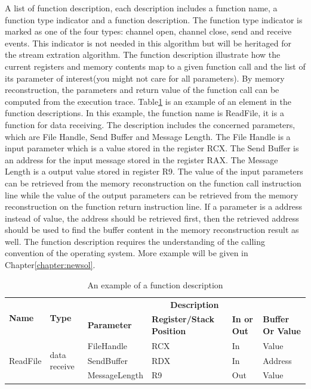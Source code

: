 A list of function description, each description includes a function name, a function type indicator and a function description. The function type indicator is marked as one of the four types: channel open, channel close, send and receive events. This indicator is not needed in this algorithm but will be heritaged for the stream extration algorithm. The function description illustrate how the current registers and memory contents map to a given function call and the list of its parameter of interest(you might not care for all parameters). By memory reconstruction\cite{cleary_reconstructing_2013}, the parameters and return value of the function call can be computed from the execution trace. Table\ref{functionexample} is an example of an element in the function descriptions. In this example, the function name is ReadFile, it is a function for data receiving. The description includes the concerned parameters, which are File Handle, Send Buffer and Message Length. The File Handle is a input parameter which is a value stored in the register RCX. The Send Buffer is an address for the input message stored in the register RAX. The Message Length is a output value stored in register R9. The value of the input parameters can be retrieved from the memory reconstruction on the function call instruction line while the value of the output parameters can be retrieved from the memory reconstruction on the function return instruction line. If a parameter is a address instead of value, the address should be retrieved first, then the retrieved address should be used to find the buffer content in the memory reconstruction result as well.  The function description requires the understanding of the calling convention of the operating system. More example will be given in Chapter\ref{chapter:newsol}.

\begin{table}[H]
        \centering
        \caption{An example of a function description}
        \label{functionexample}
        \begin{tabular}{|l|l|l|l|l|l|}
            \hline
             \multirow{2}{*}{{\textbf{Name}}} & \multirow{2}{*}{{\textbf{Type}}} & \multicolumn{4}{c|}{\textbf{Description}}  \\
              \cline{3-6} 
             & & \textbf{Parameter}& \textbf{Register/Stack Position}& \textbf{In or Out} &  \textbf{Buffer Or Value}  \\
             \hline
             \multirow{3}{*}{ReadFile}
             &\multirow{3}{*}{data receive} &  FileHandle & RCX & In & Value\\
              \cline{3-6} 
             & & SendBuffer & RDX & In & Address\\
              \cline{3-6} 
             & & MessageLength & R9 & Out & Value\\
            \hline            
        \end{tabular}
    \end{table}

